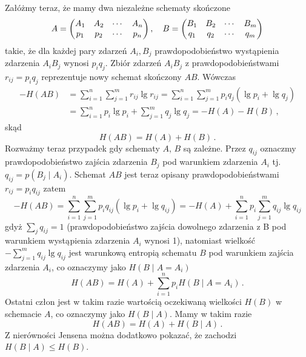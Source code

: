 \documentclass{myclass}
\begin{document}
Załóżmy teraz, że mamy dwa niezależne schematy skończone
\begin{equation*}
    A = \mqty(A_1 & A_2 & \cdots & A_n \\ p_1 & p_2 & \cdots & p_n)\,,\quad B = \mqty(B_1 & B_2 & \cdots & B_m \\ q_1 & q_2 & \cdots & q_m)
\end{equation*}
takie, że dla każdej pary zdarzeń \(A_i, B_j\) prawdopodobieństwo wystąpienia zdarzenia \(A_iB_j\)
wynosi \(p_iq_j\). Zbiór zdarzeń \(A_iB_j\) z prawdopodobieństwami \(r_{ij} = p_i q_j\) reprezentuje
nowy schemat skończony \(AB\). Wówczas
\begin{equation*}
    \begin{split}
        -H(AB) &= \sum_{i=1}^n\sum_{j=1}^m r_{ij}\lg r_{ij} = \sum_{i=1}^n\sum_{j=1}^m p_iq_j\left(\lg p_i + \lg q_j\right) \\
        &= \sum_{i=1}^n p_i\lg p_i + \sum_{j=1}^m q_j \lg q_j = -H(A) - H(B)\,,  
    \end{split}
\end{equation*}
skąd
\begin{equation*}
    H(AB) = H(A) + H(B)\,.
\end{equation*}
Rozważmy teraz przypadek gdy schematy \(A\), \(B\) są zależne. Przez \(q_{ij}\) oznaczmy
prawdopodobieństwo zajścia zdarzenia \(B_j\) pod warunkiem zdarzenia \(A_i\) tj. \(q_{ij} =
p(B_j\mid A_i)\). Schemat \(AB\) jest teraz opisany prawdopodobieństwami \(r_{ij} = p_i q_{ij}\)
zatem
\begin{equation*}
    -H(AB) = \sum_{i=1}^n\sum_{j=1}^m p_i q_{ij} \left(\lg p_i + \lg q_{ij}\right) = - H(A) + \sum_{i=1}^n p_i \sum_{j=1}^m q_{ij} \lg q_{ij}
\end{equation*}
gdyż \(\sum_j q_{ij} = 1\) (prawdopodobieństwo zajścia dowolnego zdarzenia z B pod warunkiem
wystąpienia zdarzenia \(A_i\) wynosi 1), natomiast wielkość \(-\sum_{j=1}^m q_{ij} \lg q_{ij}\) jest
warunkową entropią schematu \(B\) pod warunkiem zajścia zdarzenia \(A_i\), co oznaczymy jako
\(H(B\mid A=A_i)\)
\begin{equation*}
    H(AB) = H(A) + \sum_{i=1}^n p_i H(B\mid A=A_i)\,.
\end{equation*}
Ostatni człon jest w takim razie wartością oczekiwaną wielkości \(H(B)\) w schemacie \(A\), co
oznaczymy jako \(H(B \mid A)\). Mamy w takim razie
\begin{equation*}
    H(AB) = H(A) + H(B \mid A)\,.
\end{equation*}
Z nierówności Jensena można dodatkowo pokazać, że zachodzi \(H(B\mid A) \leq H(B)\).
\end{document}
